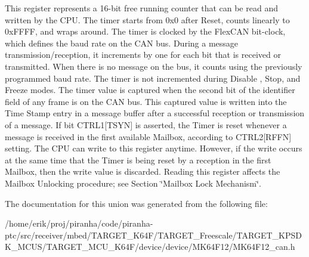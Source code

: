 This register represents a 16-\/bit free running counter that can be read and written by the C\+PU. The timer starts from 0x0 after Reset, counts linearly to 0x\+F\+F\+FF, and wraps around. The timer is clocked by the Flex\+C\+AN bit-\/clock, which defines the baud rate on the C\+AN bus. During a message transmission/reception, it increments by one for each bit that is received or transmitted. When there is no message on the bus, it counts using the previously programmed baud rate. The timer is not incremented during Disable , Stop, and Freeze modes. The timer value is captured when the second bit of the identifier field of any frame is on the C\+AN bus. This captured value is written into the Time Stamp entry in a message buffer after a successful reception or transmission of a message. If bit C\+T\+R\+L1\mbox{[}T\+S\+YN\mbox{]} is asserted, the Timer is reset whenever a message is received in the first available Mailbox, according to C\+T\+R\+L2\mbox{[}R\+F\+FN\mbox{]} setting. The C\+PU can write to this register anytime. However, if the write occurs at the same time that the Timer is being reset by a reception in the first Mailbox, then the write value is discarded. Reading this register affects the Mailbox Unlocking procedure; see Section \char`\"{}\+Mailbox Lock Mechanism\char`\"{}. 

The documentation for this union was generated from the following file\+:\begin{DoxyCompactItemize}
\item 
/home/erik/proj/piranha/code/piranha-\/ptc/src/receiver/mbed/\+T\+A\+R\+G\+E\+T\+\_\+\+K64\+F/\+T\+A\+R\+G\+E\+T\+\_\+\+Freescale/\+T\+A\+R\+G\+E\+T\+\_\+\+K\+P\+S\+D\+K\+\_\+\+M\+C\+U\+S/\+T\+A\+R\+G\+E\+T\+\_\+\+M\+C\+U\+\_\+\+K64\+F/device/device/\+M\+K64\+F12/M\+K64\+F12\+\_\+can.\+h\end{DoxyCompactItemize}
